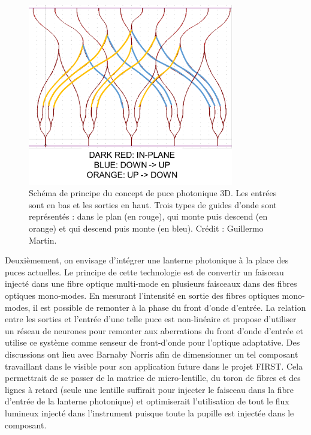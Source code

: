 \begin{figure}[ht!]
    \centering
    \includegraphics[width=0.8\textwidth]{Figure_Chap1/Martin2022_FIRST573D_Figure1.png}
    \caption[Schéma de principe du concept de puce photonique 3D.]{Schéma de principe du concept de puce photonique 3D. Les entrées sont en bas et les sorties en haut. Trois types de guides d'onde sont représentés : dans le plan (en rouge), qui monte puis descend (en orange) et qui descend puis monte (en bleu). Crédit : Guillermo Martin.}
    \label{fig:Chip5T3D}
\end{figure}

Deuxièmement, on envisage d'intégrer une lanterne photonique \citep{leonsaval2005} à la place des puces actuelles. Le principe de cette technologie est de convertir un faisceau injecté dans une fibre optique multi-mode en plusieurs faisceaux dans des fibres optiques mono-modes. En mesurant l'intensité en sortie des fibres optiques mono-modes, il est possible de remonter à la phase du front d'onde d'entrée. La relation entre les sorties et l'entrée d'une telle puce est non-linéaire et \cite{norris2020} propose d'utiliser un réseau de neurones pour remonter aux aberrations du front d'onde d'entrée et utilise ce système comme senseur de front-d'onde pour l'optique adaptative. Des discussions ont lieu avec Barnaby Norris afin de dimensionner un tel composant travaillant dans le visible pour son application future dans le projet \ac{FIRST}. Cela permettrait de se passer de la matrice de micro-lentille, du toron de fibres et des lignes à retard (seule une lentille suffirait pour injecter le faisceau dans la fibre d'entrée de la lanterne photonique) et optimiserait l'utilisation de tout le flux lumineux injecté dans l'instrument puisque toute la pupille est injectée dans le composant.


